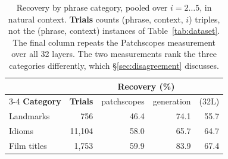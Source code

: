\begin{table}[t]
\centering\small
\begin{tabular}{lrrrr}
\toprule
& & \multicolumn{2}{c}{\textbf{Recovery (\%)}} & \\
\cmidrule(lr){3-4}
\textbf{Category} & \textbf{Trials} & patchscopes & generation & \small{(32L)} \\
\midrule
Landmarks & 756 & 46.4 & 74.1 & 55.7 \\
Idioms & 11,104 & 58.0 & 65.7 & 64.7 \\
Film titles & 1,753 & 59.9 & 83.9 & 67.4 \\
\bottomrule
\end{tabular}
\caption{Recovery by phrase category, pooled over $i=2\ldots5$, in natural
context. \textbf{Trials} counts (phrase, context, $i$) triples, not the
(phrase, context) instances of Table~\ref{tab:dataset}. The final column
repeats the Patchscopes measurement over all 32 layers. The two measurements
rank the three categories differently, which \S\ref{sec:disagreement}
discusses.}
\label{tab:categories}
\end{table}
